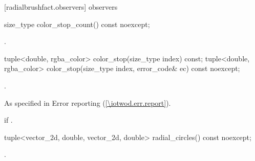  [radialbrushfact.observers] { observers}

\begin{itemdecl}
size_type color_stop_count() const noexcept;
\end{itemdecl}
\begin{itemdescr}
\pnum
\returns
{}.
\end{itemdescr}

\begin{itemdecl}
tuple<double, rgba_color> color_stop(size_type index) const;
tuple<double, rgba_color> color_stop(size_type index,
  error_code& ec) const noexcept;
\end{itemdecl}
\begin{itemdescr}
\pnum
\returns
{}.

\pnum
\throws
As specified in Error reporting (\ref{\iotwod.err.report}).

\pnum
\errors
{} if .
\end{itemdescr}

\begin{itemdecl}
tuple<vector_2d, double, vector_2d, double> radial_circles() const noexcept;
\end{itemdecl}
\begin{itemdescr}
\pnum
\returns
{}.
\end{itemdescr}
